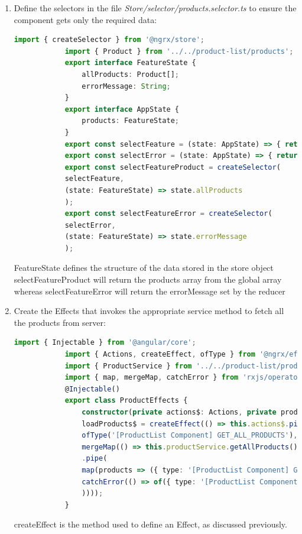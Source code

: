 \documentclass{report}
\begin{document}
\begin{enumerate}
\begin{lstlisting}[language=Typescript, caption=Store/reducers/products.reducer.ts]
			);
			export function productReducer(state:any, action:any) {
				return _productReducer(state, action);
			}
\end{lstlisting}
productReducer is the reducer function that handles actions dispatched by the components as well as the effects after making the API calls
\item{Define the selectors in the file \textit{Store/selector/products.selector.ts} to ensure the component gets only the required data:}
		\begin{lstlisting}[caption=Store/selector/products.selector.ts, language=Typescript]
			import { createSelector } from '@ngrx/store';
			import { Product } from '../../product-list/products';
			export interface FeatureState {
				allProducts: Product[];
				errorMessage: String;
			}
			export interface AppState {
				products: FeatureState; 
			}
			export const selectFeature = (state: AppState) => { return state.products };
			export const selectError = (state: AppState) => { return state.products };
			export const selectFeatureProduct = createSelector(
			selectFeature,
			(state: FeatureState) => state.allProducts
			);
			export const selectFeatureError = createSelector(
			selectError,
			(state: FeatureState) => state.errorMessage
			);
\end{lstlisting}
FeatureState defines the structure of the data stored in the store object 
selectFeatureProduct will return the products array from the global array whereas selectFeatureError will return the errorMessage set by the reducer

\item{Create the Effects that invokes the appropriate service method to fetch all the products from server:}
		\begin{lstlisting}[caption=product-effects.ts, language=Typescript]
			import { Injectable } from '@angular/core';
			import { Actions, createEffect, ofType } from '@ngrx/effects';
			import { ProductService } from '../../product-list/product.service';
			import { map, mergeMap, catchError } from 'rxjs/operators';
			@Injectable()
			export class ProductEffects {
				constructor(private actions$: Actions, private productService: ProductService) { }
				loadProducts$ = createEffect(() => this.actions$.pipe(
				ofType('[ProductList Component] GET_ALL_PRODUCTS'),
				mergeMap(() => this.productService.getAllProducts()
				.pipe(
				map(products => ({ type: '[ProductList Component] GET_ALL_PRODUCTS SUCCESS', allProducts: products })),
				catchError(() => of({ type: '[ProductList Component] GET_ALL_PRODUCTS ERROR', errorMessage: 'No Products Found' }))
				))));
			}
\end{lstlisting}
createEffect is the method used to define an Effect, as discussed previously.


\end{enumerate}
\end{document}
